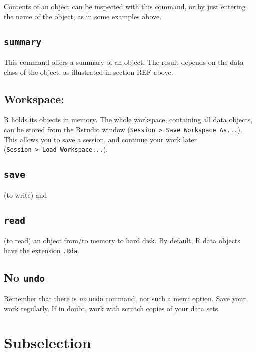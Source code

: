 \documentclass[
]{book}
\begin{document}
Contents of an object can be inspected with this command, or by just
entering the name of the object, as in some examples above.

\hypertarget{summary}{%
\subsection{\texorpdfstring{\texttt{summary}}{summary}}\label{summary}}

This command offers a summary of an object. The result depends on
the data class of the object, as illustrated in section REF
above.

\hypertarget{workspace}{%
\subsection{Workspace:}\label{workspace}}

R holds its objects in memory. The whole workspace,
containing all data objects, can be stored from the
Rstudio window (\texttt{Session\ \textgreater{}\ Save\ Workspace\ As...}).
This allows you to save a
session, and continue your work later (\texttt{Session\ \textgreater{}\ Load\ Workspace...}).

\hypertarget{save}{%
\subsection{\texorpdfstring{\texttt{save}}{save}}\label{save}}

(to write) and

\hypertarget{read}{%
\subsection{\texorpdfstring{\texttt{read}}{read}}\label{read}}

(to read) an object from/to memory to hard disk. By default,
R data objects have the extension \texttt{.Rda}.

\hypertarget{no-undo}{%
\subsection{\texorpdfstring{No \texttt{undo}}{No undo}}\label{no-undo}}

Remember that there is \emph{no} \texttt{undo} command, nor such a menu
option. Save your work regularly. If in doubt, work with scratch
copies of your data sets.

\hypertarget{sec:subselection}{%
\section{Subselection}\label{sec:subselection}}
\end{document}
